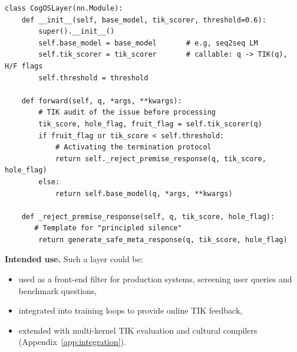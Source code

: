 \documentclass[11pt]{article}
\begin{document}


\begin{listing}[H]
\caption{CogOS in PyTorch-style pseudocode:}
\label{code:cogos_layer}
\begin{verbatim}
class CogOSLayer(nn.Module):
    def __init__(self, base_model, tik_scorer, threshold=0.6):
        super().__init__()
        self.base_model = base_model       # e.g, seq2seq LM
        self.tik_scorer = tik_scorer       # callable: q -> TIK(q), H/F flags
        self.threshold = threshold

    def forward(self, q, *args, **kwargs):
        # TIK audit of the issue before processing
        tik_score, hole_flag, fruit_flag = self.tik_scorer(q)
        if fruit_flag or tik_score < self.threshold:
            # Activating the termination protocol
            return self._reject_premise_response(q, tik_score, hole_flag)
        else:
            return self.base_model(q, *args, **kwargs)

    def _reject_premise_response(self, q, tik_score, hole_flag):
       # Template for "principled silence"
        return generate_safe_meta_response(q, tik_score, hole_flag)
\end{verbatim}
\end{listing}

\textbf{Intended use.} Such a layer could be:
\begin{itemize}
    \item used as a front-end filter for production systems, screening user queries and benchmark questions,
    \item integrated into training loops to provide online TIK feedback,
    \item extended with multi-kernel TIK evaluation and cultural compilers (Appendix~\ref{app:integration}).
\end{itemize}
\end{document}
